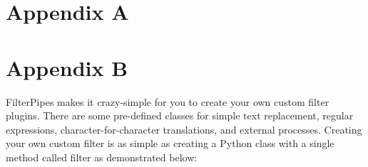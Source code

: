 \documentclass[a4paper, 12pt, twoside,openright]{report}
\begin{document}
\Appendix
	\chapter{Appendix A}
	\minitoc
		
		
		
		
		

	\chapter{Appendix B}
	\minitoc
%		
		

FilterPipes makes it crazy-simple for you to create your own custom filter plugins.
There are some pre-defined classes for simple text replacement,
	regular expressions,
	character-for-character translations,
	and external processes.
Creating your own custom filter is as simple as creating a Python class with a single method called filter as demonstrated below:

\printbibheading

\printbibliography[heading=subbibliography,notkeyword={Behavioral}, title=Others]
\end{document}
